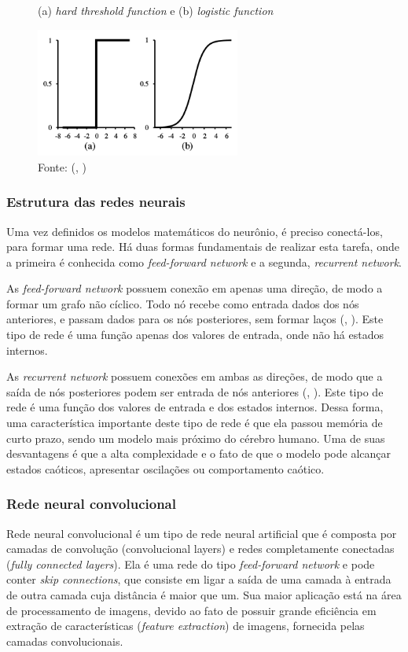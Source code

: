 \documentclass[]{politex}
\begin{document}
\begin{figure}[H]
    \centering
    \caption{(a) \textit{hard threshold function} e (b)\textit{ logistic function}}
    \includegraphics[width=0.6\textwidth]{funcativacao}
    \caption*{Fonte: (, \citeyear{Russell})}
    \label{fig:funcativacao}
\end{figure}

\subsubsection{Estrutura das redes neurais}
Uma vez definidos os modelos matemáticos do neurônio, é preciso conectá-los, para formar uma rede. Há duas formas fundamentais de realizar esta tarefa, onde a primeira é conhecida como \textit{feed-forward network} e a segunda, \textit{recurrent network}.

As \textit{feed-forward network} possuem conexão em apenas uma direção, de modo a formar um grafo não cíclico. Todo nó recebe como entrada dados dos nós anteriores, e passam dados para os nós posteriores, sem formar laços (, \citeyear{Russell}). Este tipo de rede é uma função apenas dos valores de entrada, onde não há estados internos.

As \textit{recurrent network} possuem conexões em ambas as direções, de modo que a saída de nós posteriores podem ser entrada de nós anteriores (, \citeyear{Russell}). Este tipo de rede é uma função dos valores de entrada e dos estados internos. Dessa forma, uma característica importante deste tipo de rede é que ela passou memória de curto prazo, sendo um modelo mais próximo do cérebro humano. Uma de suas desvantagens é que a alta complexidade e o fato de que o modelo pode alcançar estados caóticos, apresentar oscilações ou comportamento caótico.

\subsubsection{Rede neural convolucional}
Rede neural convolucional é um tipo de rede neural artificial que é composta por camadas de convolução (convolucional layers) e redes completamente conectadas (\textit{fully connected layers}). Ela é uma rede do tipo \textit{feed-forward network} e pode conter \textit{skip connections}, que consiste em ligar a saída de uma camada à entrada de outra camada cuja distância é maior que um. Sua maior aplicação está na área de processamento de imagens, devido ao fato de possuir grande eficiência em extração de características (\textit{feature extraction}) de imagens, fornecida pelas camadas convolucionais.
\end{document}

